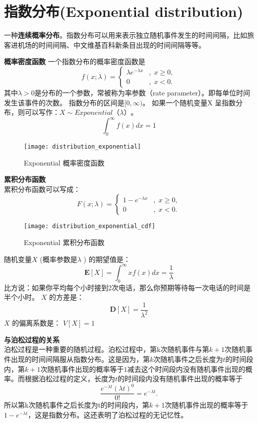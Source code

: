 \documentclass[openany]{book}
\begin{document}
\section{指数分布(Exponential distribution)}
\label{sec.distribution.exponential}
一种\textbf{连续概率分布}。指数分布可以用来表示独立随机事件发生的时间间隔，比如旅客进机场的时间间隔、中文维基百科新条目出现的时间间隔等等。

\textbf{概率密度函数}
一个指数分布的概率密度函数是
$$f(x;\lambda )=\left\{{\begin{matrix}\lambda e^{{-\lambda x}}&,\;x\geq 0,\\0&,\;x<0.\end{matrix}}\right.$$
其中$\lambda  > 0$是分布的一个参数，常被称为率参数（rate parameter）。即每单位时间发生该事件的次数。
指数分布的区间是$[0,\infty)$。 如果一个随机变量X 呈指数分布，则可以写作：$X \sim Exponential（\lambda ）$。
$$
\int_0^{\infty} f(x)dx = 1
$$
\begin{figure}[htbp]
  \centering
  \texttt{[image: distribution\_exponential]}\\
  \caption{Exponential 概率密度函数}\label{fig.distribution.exponential}
\end{figure}
	
\textbf{累积分布函数}\\
累积分布函数可以写成：
$$F(x;\lambda )=\left\{{\begin{matrix}1-e^{{-\lambda x}}&,\;x\geq 0,\\0&,\;x<0.\end{matrix}}\right.$$
\begin{figure}[htbp]
  \centering
  \texttt{[image: distribution\_exponential\_cdf]}\\
  \caption{Exponential 累积分布函数}\label{fig.distribution.exponential.cdf}
\end{figure}
	
随机变量$X$ (概率参数是$\lambda$ ) 的期望值是：
$$
{\mathbf  {E}}[X]=\int_0^{\infty} xf(x)dx = {\frac  {1}{\lambda }}
$$
比方说：如果你平均每个小时接到2次电话，那么你预期等待每一次电话的时间是半个小时。
$X$ 的方差是：
$${\mathbf  {D}}[X]={\frac{1}{\lambda ^{2}}}
$$
$X$ 的偏离系数是： $V[X] = 1$

\textbf{与泊松过程的关系}\\
泊松过程是一种重要的随机过程。泊松过程中，第k次随机事件与第$k+1$次随机事件出现的时间间隔服从指数分布。这是因为，第$k$次随机事件之后长度为$t$的时间段内，第$k+1$次随机事件出现的概率等于$1$减去这个时间段内没有随机事件出现的概率。而根据泊松过程的定义，长度为$t$的时间段内没有随机事件出现的概率等于
$$
{\frac  {e^{{-\lambda t}}(\lambda t)^{0}}{0!}}=e^{{-\lambda t}}.
$$
所以第k次随机事件之后长度为t的时间段内，第$k+1$次随机事件出现的概率等于$1-e^{{-\lambda t}}$，这是指数分布。这还表明了泊松过程的无记忆性。
\end{document}
